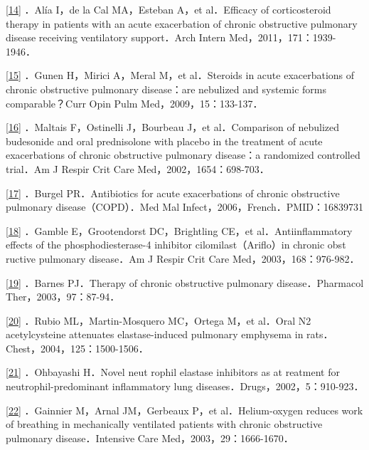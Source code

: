 \protect\hyperlink{text00012.htmlux5cux23ch14-11-back}{{[}14{]}} ．Alía
I，de la Cal MA，Esteban A，et al．Efficacy of corticosteroid therapy in
patients with an acute exacerbation of chronic obstructive pulmonary
disease receiving ventilatory support．Arch Intern
Med，2011，171：1939-1946．

\protect\hyperlink{text00012.htmlux5cux23ch15-11-back}{{[}15{]}} ．Gunen
H，Mirici A，Meral M，et al．Steroids in acute exacerbations of chronic
obstructive pulmonary disease：are nebulized and systemic forms
comparable？Curr Opin Pulm Med，2009，15：133-137．

\protect\hyperlink{text00012.htmlux5cux23ch16-11-back}{{[}16{]}}
．Maltais F，Ostinelli J，Bourbeau J，et al．Comparison of nebulized
budesonide and oral prednisolone with placebo in the treatment of acute
exacerbations of chronic obstructive pulmonary disease：a randomized
controlled trial．Am J Respir Crit Care Med，2002，1654：698-703．

\protect\hyperlink{text00012.htmlux5cux23ch17-11-back}{{[}17{]}}
．Burgel PR．Antibiotics for acute exacerbations of chronic obstructive
pulmonary disease（COPD）．Med Mal Infect，2006，French．PMID：16839731

\protect\hyperlink{text00012.htmlux5cux23ch18-11-back}{{[}18{]}}
．Gamble E，Grootendorst DC，Brightling CE，et al．Antiinflammatory
effects of the phosphodiesterase-4 inhibitor cilomilast（Ariflo）in
chronic obst ructive pulmonary disease．Am J Respir Crit Care
Med，2003，168：976-982．

\protect\hyperlink{text00012.htmlux5cux23ch19-11-back}{{[}19{]}}
．Barnes PJ．Therapy of chronic obstructive pulmonary disease．Pharmacol
Ther，2003，97：87-94．

\protect\hyperlink{text00012.htmlux5cux23ch20-11-back}{{[}20{]}} ．Rubio
ML，Martin-Mosquero MC，Ortega M，et al．Oral N2 acetylcysteine
attenuates elastase-induced pulmonary emphysema in
rats．Chest，2004，125：1500-1506．

\protect\hyperlink{text00012.htmlux5cux23ch21-11-back}{{[}21{]}}
．Ohbayashi H．Novel neut rophil elastase inhibitors as at reatment for
neutrophil-predominant inflammatory lung
diseases．Drugs，2002，5：910-923．

\protect\hyperlink{text00012.htmlux5cux23ch22-11-back}{{[}22{]}}
．Gainnier M，Arnal JM，Gerbeaux P，et al．Helium-oxygen reduces work of
breathing in mechanically ventilated patients with chronic obstructive
pulmonary disease．Intensive Care Med，2003，29：1666-1670．

